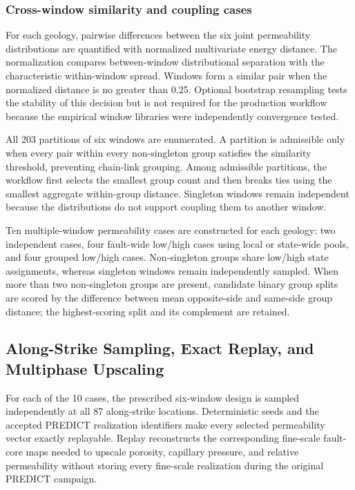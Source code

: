 \subsubsection{Cross-window similarity and coupling cases}

For each geology, pairwise differences between the six joint permeability
distributions are quantified with normalized multivariate energy distance.
The normalization compares between-window distributional separation with the
characteristic within-window spread. Windows form a similar pair when the
normalized distance is no greater than 0.25. Optional bootstrap resampling
tests the stability of this decision but is not required for the production
workflow because the empirical window libraries were independently
convergence tested.

All 203 partitions of six windows are enumerated. A partition is admissible
only when every pair within every non-singleton group satisfies the similarity
threshold, preventing chain-link grouping. Among admissible partitions, the
workflow first selects the smallest group count and then breaks ties using the
smallest aggregate within-group distance. Singleton windows remain independent
because the distributions do not support coupling them to another window.

Ten multiple-window permeability cases are constructed for each geology: two
independent cases, four fault-wide low/high cases using local or state-wide
pools, and four grouped low/high cases. Non-singleton groups share low/high
state assignments, whereas singleton windows remain independently sampled.
When more than two non-singleton groups are present, candidate binary group
splits are scored by the difference between mean opposite-side and same-side
group distance; the highest-scoring split and its complement are retained.

\subsection{Along-Strike Sampling, Exact Replay, and Multiphase Upscaling}

For each of the 10 cases, the prescribed six-window design is sampled
independently at all 87 along-strike locations. Deterministic seeds and the
accepted PREDICT realization identifiers make every selected permeability
vector exactly replayable. Replay reconstructs the corresponding fine-scale
fault-core maps needed to upscale porosity, capillary pressure, and relative
permeability without storing every fine-scale realization during the original
PREDICT campaign.

